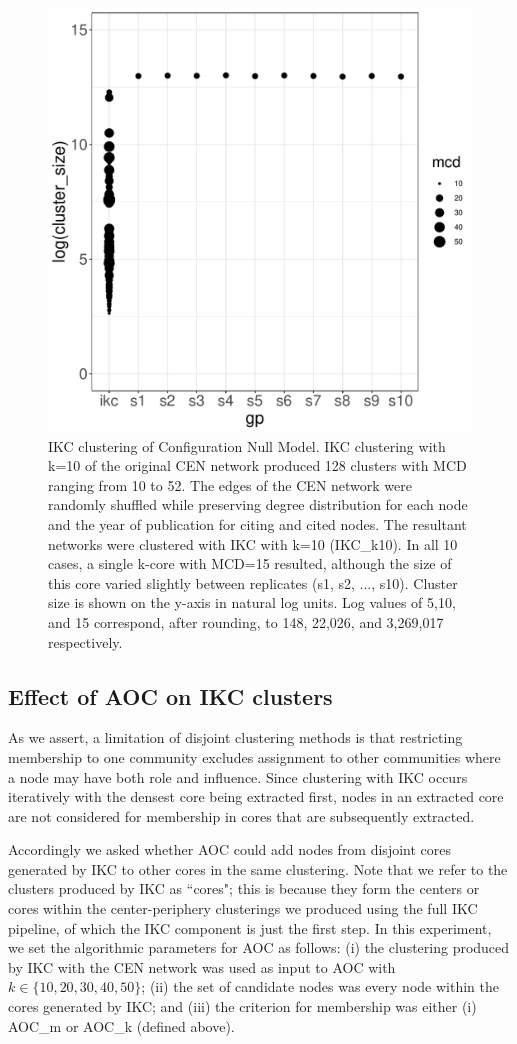\documentclass[12pt, oneside]{article}   	%
\begin{document}
\begin{figure}[H]
\centering
\includegraphics[width=0.6\linewidth]{shuffleplot.pdf} 
\captionsetup{width=0.9\textwidth}
\caption{IKC clustering of Configuration Null Model. IKC clustering with k=10 of the original CEN network produced 128 clusters  with MCD ranging from 10 to 52. The edges of the CEN network were randomly shuffled while preserving degree distribution for each node and the year of publication for citing and cited nodes. The resultant networks were clustered with IKC with k=10 (IKC\_k10).  In all 10 cases, a single k-core with MCD=15 resulted, although the size of this core varied slightly between replicates (s1, s2, ..., s10). Cluster size is shown on the y-axis in natural log units. Log values of 5,10, and 15 correspond, after rounding, to 148, 22,026, and 3,269,017 respectively.}
\label{fig:shuffleplot}
\end{figure}
	
\subsection{Effect of AOC on IKC clusters} 
As we assert, a limitation of disjoint clustering methods is that restricting membership to one community excludes assignment to other communities where a node may have both role and influence. Since clustering with IKC occurs iteratively with the densest core being extracted first, nodes in an extracted core are not considered for membership in cores that are subsequently extracted.

Accordingly we asked whether AOC could add nodes from disjoint cores generated by IKC to other cores in the same clustering. Note that we refer to the clusters produced by IKC as ``cores"; this is because they form the centers or cores within the center-periphery clusterings we produced using the full IKC pipeline, of which the IKC component is just the first step. In this experiment,  we set the algorithmic parameters for AOC as follows: (i) the clustering produced by IKC with the CEN network was used as input to AOC with $k \in \{10, 20, 30, 40, 50\}$; (ii) the set of candidate nodes was every node within the cores generated by IKC; and (iii) the criterion for membership was either (i) AOC\_m or AOC\_k (defined above).
\end{document}
